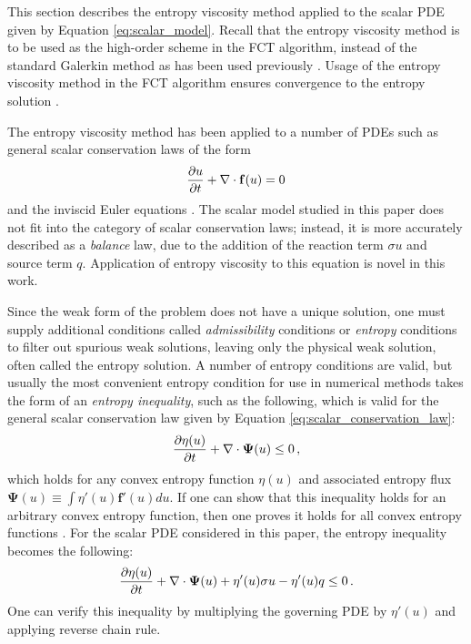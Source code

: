 
This section describes the entropy viscosity method applied to the scalar
PDE given by Equation \eqref{eq:scalar_model}. Recall that the entropy
viscosity method is to be used as the high-order scheme in the FCT algorithm,
instead of the standard Galerkin method as has been used previously
\cite{kuzmin_FCT}.
Usage of the entropy viscosity method in the FCT algorithm ensures convergence
to the entropy solution \cite{guermond_secondorder}.

The entropy viscosity method has been applied to a number of PDEs
such as general scalar conservation laws of the form
\begin{equation}\label{eq:scalar_conservation_law}
  \frac{\partial u}{\partial t} + \nabla\cdot\mathbf{f}(u) = 0
\end{equation}
and the inviscid Euler equations \cite{guermond_ev}. The scalar model studied
in this paper does not fit into the category of scalar conservation laws;
instead, it is more accurately described as a \emph{balance} law, due to
the addition of the reaction term $\sigma u$ and source term $q$. Application
of entropy viscosity to this equation is novel in this work.

Since the weak form of the problem does not have a unique solution, one
must supply additional conditions called \emph{admissibility} conditions or
\emph{entropy} conditions to filter out spurious weak solutions, leaving
only the physical weak solution, often called the entropy solution.
A number of entropy conditions are valid, but usually the most convenient
entropy condition for use in numerical methods takes the form of an
\emph{entropy inequality}, such as the following, which is valid for the
general scalar conservation law given by Equation \eqref{eq:scalar_conservation_law}:
\begin{equation}
  \frac{\partial \eta(u)}{\partial t} + \nabla\cdot\mathbf{\Psi}(u) \leq 0 \,,
\end{equation}
which holds for any convex entropy function $\eta(u)$ and associated entropy
flux $\mathbf{\Psi}(u) \equiv \int \eta'(u)\mathbf{f}'(u)du$.
If one can show that this inequality holds for an arbitrary
convex entropy function, then one proves it holds for all convex entropy
functions  \cite{leveque2002}\cite{guermond_ev}.
For the scalar PDE considered in this paper, the entropy inequality becomes
the following:
\begin{equation}
  \frac{\partial \eta(u)}{\partial t} + \nabla\cdot\mathbf{\Psi}(u) + \eta'(u)\sigma u - \eta'(u)q
    \leq 0 \,.
\end{equation}
One can verify this inequality by multiplying the governing PDE by $\eta'(u)$
and applying reverse chain rule.

